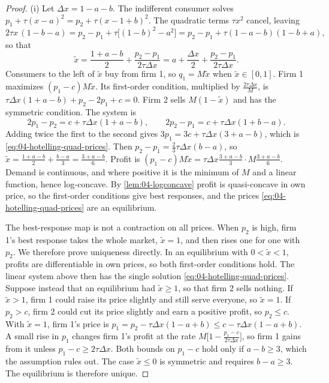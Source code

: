 \begin{proof}
(i) Let $\Delta x = 1 - a - b$. The indifferent consumer solves $p_1 + \tau(x - a)^2 = p_2 + \tau(x - 1 + b)^2$. The
quadratic terms $\tau x^2$ cancel, leaving
\begin{equation*}
2\tau x\,(1 - b - a) = p_2 - p_1 + \tau\big[(1 - b)^2 - a^2\big] = p_2 - p_1 + \tau(1 - a - b)(1 - b + a),
\end{equation*}
so that
\begin{equation*}
\tilde x = \frac{1 + a - b}{2} + \frac{p_2 - p_1}{2\tau\Delta x} = a + \frac{\Delta x}{2} + \frac{p_2 - p_1}{2\tau\Delta x}.
\end{equation*}
Consumers to the left of $\tilde x$ buy from firm 1, so $q_1 = M\tilde x$ when $\tilde x \in [0,1]$. Firm 1 maximizes
$(p_1 - c)M\tilde x$. Its first-order condition, multiplied by $\frac{2\tau\Delta x}{M}$, is
$\tau\Delta x(1 + a - b) + p_2 - 2p_1 + c = 0$. Firm 2 sells $M(1 - \tilde x)$ and has the symmetric condition.
The system is
\begin{equation*}
2p_1 - p_2 = c + \tau\Delta x(1 + a - b), \qquad 2p_2 - p_1 = c + \tau\Delta x(1 + b - a).
\end{equation*}
Adding twice the first to the second gives $3p_1 = 3c + \tau\Delta x(3 + a - b)$, which is
\eqref{eq:04-hotelling-quad-prices}. Then $p_2 - p_1 = \frac{2}{3}\tau\Delta x(b - a)$, so
$\tilde x = \frac{1 + a - b}{2} + \frac{b - a}{3} = \frac{3 + a - b}{6}$. Profit is
$(p_1 - c)M\tilde x = \tau\Delta x\frac{3 + a - b}{3}\cdot M\frac{3 + a - b}{6}$. Demand is continuous, and where
positive it is the minimum of $M$ and a linear function, hence log-concave. By \cref{lem:04-logconcave} profit is
quasi-concave in own price, so the first-order conditions give best responses, and the prices
\eqref{eq:04-hotelling-quad-prices} are an equilibrium.

The best-response map is not a contraction on all prices. When $p_2$ is high, firm 1's best response takes the
whole market, $\tilde x = 1$, and then rises one for one with $p_2$. We therefore prove uniqueness directly. In an
equilibrium with $0 < \tilde x < 1$, profits are differentiable in own prices, so both first-order conditions hold.
The linear system above then has the single solution \eqref{eq:04-hotelling-quad-prices}. Suppose instead that an
equilibrium had $\tilde x \geq 1$, so that firm 2 sells nothing. If $\tilde x > 1$, firm 1 could raise its price
slightly and still serve everyone, so $\tilde x = 1$. If $p_2 > c$, firm 2 could cut its price slightly and earn a
positive profit, so $p_2 \leq c$. With $\tilde x = 1$, firm 1's price is
$p_1 = p_2 - \tau\Delta x(1 - a + b) \leq c - \tau\Delta x(1 - a + b)$. A small rise in $p_1$ changes firm 1's
profit at the rate $M\big[1 - \frac{p_1 - c}{2\tau\Delta x}\big]$, so firm 1 gains from it unless
$p_1 - c \geq 2\tau\Delta x$. Both bounds on $p_1 - c$ hold only if $a - b \geq 3$, which the assumption rules out.
The case $\tilde x \leq 0$ is symmetric and requires $b - a \geq 3$. The equilibrium is therefore unique.


\end{proof}
